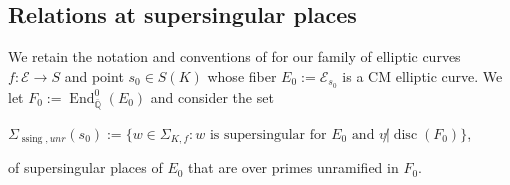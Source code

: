 \documentclass[12pt,twoside,a4paper]{article}
\theoremstyle{plain}%
\DeclareMathOperator{\End}{End}
\DeclareMathOperator{\disc}{disc}
\DeclareMathOperator{\ssing}{ssing}
\newcommand{\Q}{\mathbb{Q}}
\newcommand{\CE}{\mathcal{E}}
\newcommand{\unr}{unr}
\begin{document}
\subsection{Relations at supersingular places}\label{section:cmsuperpadic}

We retain the notation and conventions of  for our family of elliptic curves $f:\CE\rightarrow S$ and point $s_0\in S(K)$ whose fiber $E_0:=\CE_{s_0}$ is a CM elliptic curve. We let $F_0:=\End_{\bar{\Q}}^{0}(E_0)$ and consider the set 
\begin{center}$\Sigma_{\ssing,\unr}(s_0):=\{w\in\Sigma_{K,f}:w \text{ is supersingular for }E_0\text{ and } v\not| \disc(F_0) \}$,\end{center}of supersingular places of $E_0$ that are over primes unramified in $F_0$.
\end{document}
